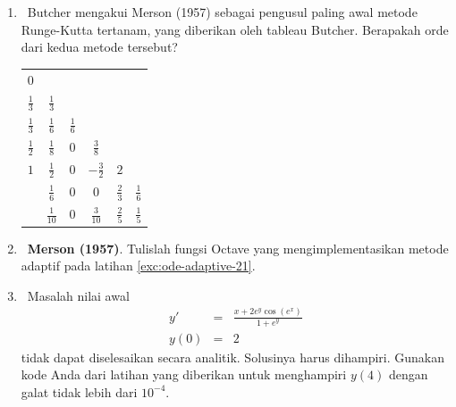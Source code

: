 \begin{enumerate}
\begin{enumerate}
\begin{center}
\begin{tabular}{c|cccc}
$0$ &  &  &  & \tabularnewline
$\frac{1}{2}$ & $\frac{1}{2}$ &  &  & \tabularnewline
$\frac{3}{4}$ & $0$ & $\frac{3}{4}$ &  & \tabularnewline
$1$ & $\frac{2}{9}$ & $\frac{1}{3}$ & $\frac{4}{9}$ & \tabularnewline
\hline 
 & $\frac{7}{24}$ & $\frac{1}{4}$ & $\frac{1}{3}$ & $\frac{1}{8}$\tabularnewline
\end{tabular}
\par\end{center}
\end{enumerate}
\item \octave\ \label{exc:ode-adaptive-21}Butcher \cite{butcherbook}
mengakui Merson (1957)
sebagai pengusul paling awal metode Runge-Kutta tertanam, yang diberikan
oleh tableau Butcher. Berapakah orde dari kedua metode tersebut?

\begin{center}
\begin{tabular}{c|ccccc}
$0$ &  &  &  &  & \tabularnewline
$\frac{1}{3}$ & $\frac{1}{3}$ &  &  &  & \tabularnewline
$\frac{1}{3}$ & $\frac{1}{6}$ & $\frac{1}{6}$ &  &  & \tabularnewline
$\frac{1}{2}$ & $\frac{1}{8}$ & $0$ & $\frac{3}{8}$ &  & \tabularnewline
$1$ & $\frac{1}{2}$ & $0$ & $-\frac{3}{2}$ & $2$ & \tabularnewline
\hline 
 & $\frac{1}{6}$ & $0$ & $0$ & $\frac{2}{3}$ & $\frac{1}{6}$\tabularnewline
\hline 
 & $\frac{1}{10}$ & $0$ & $\frac{3}{10}$ & $\frac{2}{5}$ & $\frac{1}{5}$\tabularnewline
\end{tabular}
\par\end{center}
\item \octave\ \label{exc:ode-adaptive-15}\textbf{Merson (1957)}. Tulislah
fungsi Octave yang mengimplementasikan metode adaptif pada latihan
\ref{exc:ode-adaptive-21}. \hasananswer 
\item \octave\ \label{exc:ode-adaptive-22}Masalah nilai awal
\begin{eqnarray}
y' & = & \frac{x+2e^{y}\cos(e^{x})}{1+e^{y}}\nonumber \\
y(0) & = & 2\label{eq:oscillatory}
\end{eqnarray}
tidak dapat diselesaikan secara analitik. Solusinya harus dihampiri.
Gunakan kode Anda dari latihan yang diberikan untuk menghampiri $y(4)$
dengan galat tidak lebih dari $10^{-4}$.


\end{enumerate}
